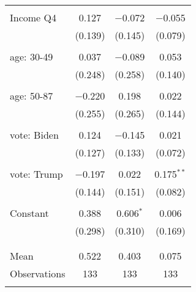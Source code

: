 \begin{tabular}{@{\extracolsep{5pt}}lccc}
  & & & \\ 
 Income Q4 & 0.127 & $-$0.072 & $-$0.055 \\ 
  & (0.139) & (0.145) & (0.079) \\ 
  & & & \\ 
 age: 30-49 & 0.037 & $-$0.089 & 0.053 \\ 
  & (0.248) & (0.258) & (0.140) \\ 
  & & & \\ 
 age: 50-87 & $-$0.220 & 0.198 & 0.022 \\ 
  & (0.255) & (0.265) & (0.144) \\ 
  & & & \\ 
 vote: Biden & 0.124 & $-$0.145 & 0.021 \\ 
  & (0.127) & (0.133) & (0.072) \\ 
  & & & \\ 
 vote: Trump & $-$0.197 & 0.022 & 0.175$^{**}$ \\ 
  & (0.144) & (0.151) & (0.082) \\ 
  & & & \\ 
 Constant & 0.388 & 0.606$^{*}$ & 0.006 \\ 
  & (0.298) & (0.310) & (0.169) \\ 
  & & & \\ 
\hline \\[-1.8ex] 
Mean & 0.522 & 0.403 & 0.075 \\ 
Observations & 133 & 133 & 133 \\ 
\hline 
\hline \\[-1.8ex] 
\end{tabular} 
